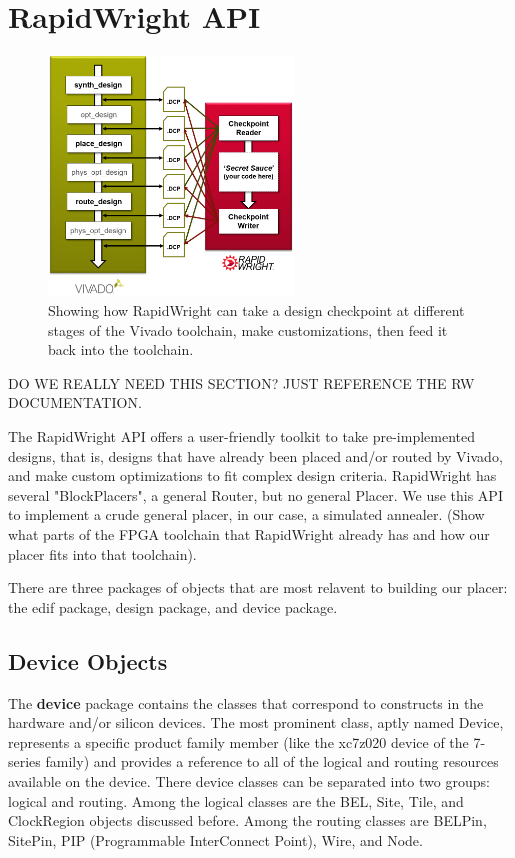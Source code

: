 \documentclass[twocolumn]{article}
\begin{document}
\section{RapidWright API}
    \begin{figure}
        \centering
        \includegraphics[width=6.5cm]{figures/vivado_dcps.png}
        \caption{Showing how RapidWright can take a design checkpoint at different stages of the Vivado toolchain, make customizations, then feed it back into the toolchain.}
        \label{fig:device_carry_chain_routing}
    \end{figure}

    DO WE REALLY NEED THIS SECTION? JUST REFERENCE THE RW DOCUMENTATION.

    The RapidWright API offers a user-friendly toolkit to take pre-implemented designs, that is, designs that have already been placed and/or routed by Vivado, and make custom optimizations to fit complex design criteria. 
    RapidWright has several "BlockPlacers", a general Router, but no general Placer. 
    We use this API to implement a crude general placer, in our case, a simulated annealer. 
    (Show what parts of the FPGA toolchain that RapidWright already has and how our placer fits into that toolchain). 

    There are three packages of objects that are most relavent to building our placer: the edif package, design package, and device package. 

    \subsection{Device Objects}
    The \textbf{device} package contains the classes that correspond to constructs in the hardware and/or silicon devices. 
    The most prominent class, aptly named Device, represents a specific product family member (like the xc7z020 device of the 7-series family) and provides a reference to all of the logical and routing resources available on the device. 
    There device classes can be separated into two groups: logical and routing. 
    Among the logical classes are the BEL, Site, Tile, and ClockRegion objects discussed before. 
    Among the routing classes are BELPin, SitePin, PIP (Programmable InterConnect Point), Wire, and Node. 
\end{document}
